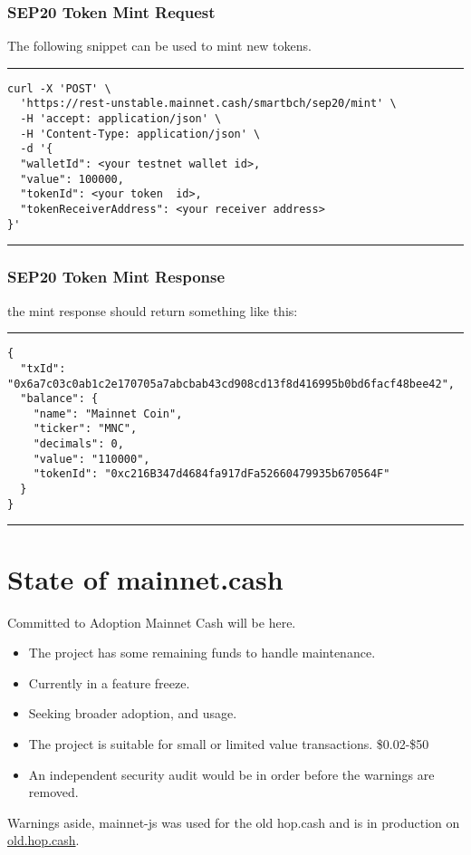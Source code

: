 \documentclass{beamer}
\begin{document}
\begin{frame}[fragile]
  \frametitle{SEP20 Token Mint Request}
  The following snippet can be used to mint new tokens.
  \rule{\textwidth}{0.9pt}
  \tiny
  \begin{verbatim}
curl -X 'POST' \
  'https://rest-unstable.mainnet.cash/smartbch/sep20/mint' \
  -H 'accept: application/json' \
  -H 'Content-Type: application/json' \
  -d '{
  "walletId": <your testnet wallet id>,
  "value": 100000,
  "tokenId": <your token  id>,
  "tokenReceiverAddress": <your receiver address>
}'
\end{verbatim}
\rule{\textwidth}{0.9pt}
\end{frame}



\begin{frame}[fragile]
  \frametitle{SEP20 Token Mint Response}
  the mint response should return something like this:
  \rule{\textwidth}{0.9pt}
  \tiny
  \begin{verbatim}
{
  "txId": "0x6a7c03c0ab1c2e170705a7abcbab43cd908cd13f8d416995b0bd6facf48bee42",
  "balance": {
    "name": "Mainnet Coin",
    "ticker": "MNC",
    "decimals": 0,
    "value": "110000",
    "tokenId": "0xc216B347d4684fa917dFa52660479935b670564F"
  }
}
\end{verbatim}
\rule{\textwidth}{0.9pt}
\end{frame}



\section{State of mainnet.cash}

\begin{frame}{Committed to Adoption}
Mainnet Cash will be here.
\begin{itemize}
\item
    The project \alert{has some remaining funds to handle maintenance}.
\item
    Currently in a \alert{feature freeze}.
\item
    Seeking \alert{broader adoption}, and usage.
\item
    The project is suitable for small or limited value transactions. \$0.02-\$50
\item
    An independent \alert{security audit} would be in order before the warnings are removed.
\end{itemize}
Warnings aside, mainnet-js was used for the old hop.cash and is in production on \href{https://old.hop.cash}{old.hop.cash}.
\end{frame}
\end{document}
